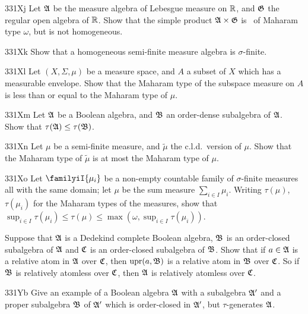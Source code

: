 {\spheader 331Xj Let $\frak A$ be the measure algebra of Lebesgue measure
on $\Bbb R$, and $\frak G$ the regular open algebra of $\Bbb R$.   Show
that the simple product $\frak A\times\frak G$ is \Mth\ of
Maharam type $\omega$, but is not homogeneous.   

\spheader 331Xk Show that a homogeneous semi-finite measure algebra is
$\sigma$-finite.

\spheader 331Xl Let $(X,\Sigma,\mu)$ be a measure space, and $A$ a subset
of $X$ which has a measurable envelope.
Show that the Maharam type of the subspace measure on $A$ is less
than or equal to the Maharam type of $\mu$.

\spheader 331Xm Let $\frak A$ be a Boolean algebra, and $\frak B$ an
order-dense subalgebra of $\frak A$.   Show that
$\tau(\frak A)\le\tau(\frak B)$.

\spheader 331Xn Let $\mu$ be a semi-finite measure, and
$\tilde\mu$ the c.l.d.\ version of $\mu$.   Show that the Maharam type
of $\tilde\mu$ is at most the Maharam type of $\mu$.   

\spheader 331Xo Let $\familyiI{\mu_i}$ be a non-empty
countable family of $\sigma$-finite
measures all with the same domain;  let $\mu$ be the sum measure
$\sum_{i\in I}\mu_i$.   Writing $\tau(\mu)$, $\tau(\mu_i)$ for the Maharam
types of the measures, show that
$\sup_{i\in I}\tau(\mu_i)
\le\tau(\mu)\le\max(\omega,\sup_{i\in I}\tau(\mu_i))$.

Suppose that $\frak A$ is a Dedekind complete Boolean algebra,
$\frak B$ is an order-closed subalgebra of $\frak A$ and $\frak C$ is an
order-closed
subalgebra of $\frak B$.   Show that if $a\in\frak A$ is a relative atom
in $\frak A$ over $\frak C$, then $\mathop{\text{upr}}(a,\frak B)$ is a relative atom
in $\frak B$ over $\frak C$.   So if $\frak B$ is relatively atomless
over $\frak C$, then $\frak A$ is relatively atomless over $\frak C$.

\spheader 331Yb Give an example of a Boolean algebra $\frak A$
with a subalgebra $\frak A'$ and a proper subalgebra $\frak B$ of $\frak
A'$ which is order-closed in $\frak A'$, but $\tau$-generates $\frak A$.

}

